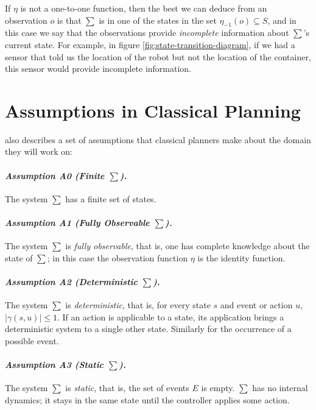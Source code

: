If $\eta$ is not a one-to-one function, then the best we can deduce from an
observation $o$ is that $\sum$ is in one of the states in the set $\eta_{-1}(o)
\subseteq S$, and in this case we say that the observations provide
\textit{incomplete} information about $\sum$’s current state. For example, in
figure \ref{fig:state-transition-diagram}, if we had a sensor that told us the
location of the robot but not the location of the container, this sensor would
provide incomplete information.

\section{Assumptions in Classical Planning}
\label{appendix:assumptions}
\cite{Nau2007} also describes a set of assumptions that classical planners make
about the domain they will work on:

\paragraph*{\textit{Assumption A0 (Finite $\sum$).}} The system $\sum$ has a
finite set of states.

\paragraph*{\textit{Assumption A1 (Fully Observable $\sum$).}} The system $\sum$
is \textit{fully observable}, that is, one has complete knowledge about the
state of $\sum$; in this case the observation function $\eta$ is the identity
function.

\paragraph*{\textit{Assumption A2 (Deterministic $\sum$).}} The system $\sum$ is
\textit{deterministic}, that is, for every state $s$ and event or action $u$,
$|\gamma(s, u)| \leq 1$. If an action is applicable to a state, its application
brings a deterministic system to a single other state. Similarly for the
occurrence of a possible event.

\paragraph*{\textit{Assumption A3 (Static $\sum$).}} The system $\sum$ is
\textit{static}, that is, the set of events $E$ is empty. $\sum$ has no internal
dynamics; it stays in the same state until the controller applies some action.

